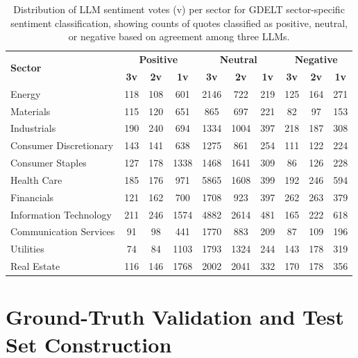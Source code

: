 \begin{table}[ht]
\centering
\caption{Distribution of LLM sentiment votes (v) per sector for GDELT sector-specific sentiment classification, showing counts of quotes classified as positive, neutral, or negative based on agreement among three LLMs.}
\label{tab:GDELT_sentiment_votes_sector}
\renewcommand{\arraystretch}{1.2}
\begin{tabular}{|l|ccc|ccc|ccc|}
\hline
\multirow{2}{*}{\textbf{Sector}} 
& \multicolumn{3}{c|}{\textbf{Positive}} 
& \multicolumn{3}{c|}{\textbf{Neutral}} 
& \multicolumn{3}{c|}{\textbf{Negative}} \\

& \textbf{3v} & \textbf{2v} & \textbf{1v}
& \textbf{3v} & \textbf{2v} & \textbf{1v}
& \textbf{3v} & \textbf{2v} & \textbf{1v} \\
\hline

Energy & 118 & 108 & 601 & 2146 & 722 & 219 & 125 & 164 & 271 \\
Materials & 115 & 120 & 651 & 865 & 697 & 221 & 82 & 97 & 153 \\
Industrials & 190 & 240 & 694 & 1334 & 1004 & 397 & 218 & 187 & 308 \\
Consumer Discretionary & 143 & 141 & 638 & 1275 & 861 & 254 & 111 & 122 & 224 \\
Consumer Staples & 127 & 178 & 1338 & 1468 & 1641 & 309 & 86 & 126 & 228 \\
Health Care & 185 & 176 & 971 & 5865 & 1608 & 399 & 192 & 246 & 594 \\
Financials & 121 & 162 & 700 & 1708 & 923 & 397 & 262 & 263 & 379 \\
Information Technology & 211 & 246 & 1574 & 4882 & 2614 & 481 & 165 & 222 & 618 \\
Communication Services & 91 & 98 & 441 & 1770 & 883 & 209 & 87 & 109 & 196 \\
Utilities & 74 & 84 & 1103 & 1793 & 1324 & 244 & 143 & 178 & 319 \\
Real Estate & 116 & 146 & 1768 & 2002 & 2041 & 332 & 170 & 178 & 356 \\

\hline
\end{tabular}
\end{table}


\section{Ground-Truth Validation and Test Set Construction}
\label{sec:test_set}


